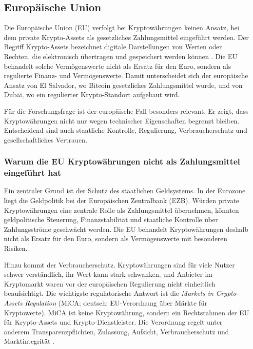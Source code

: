 

\subsection{Europäische Union}

Die Europäische Union (EU) verfolgt bei Kryptowährungen keinen Ansatz, bei dem private Krypto-Assets als gesetzliches Zahlungsmittel eingeführt werden. Der Begriff Krypto-Assets bezeichnet digitale Darstellungen von Werten oder Rechten, die elektronisch übertragen und gespeichert werden können \cite{MiCA2023}. Die EU behandelt solche Vermögenswerte nicht als Ersatz für den Euro, sondern als regulierte Finanz- und Vermögenswerte. Damit unterscheidet sich der europäische Ansatz von El Salvador, wo Bitcoin gesetzliches Zahlungsmittel wurde, und von Dubai, wo ein regulierter Krypto-Standort aufgebaut wird.

Für die Forschungsfrage ist der europäische Fall besonders relevant. Er zeigt, dass Kryptowährungen nicht nur wegen technischer Eigenschaften begrenzt bleiben. Entscheidend sind auch staatliche Kontrolle, Regulierung, Verbraucherschutz und gesellschaftliches Vertrauen.

\subsubsection{Warum die EU Kryptowährungen nicht als Zahlungsmittel eingeführt hat}

Ein zentraler Grund ist der Schutz des staatlichen Geldsystems. In der Eurozone liegt die Geldpolitik bei der Europäischen Zentralbank (EZB). Würden private Kryptowährungen eine zentrale Rolle als Zahlungsmittel übernehmen, könnten geldpolitische Steuerung, Finanzstabilität und staatliche Kontrolle über Zahlungsströme geschwächt werden. Die EU behandelt Kryptowährungen deshalb nicht als Ersatz für den Euro, sondern als Vermögenswerte mit besonderen Risiken.

Hinzu kommt der Verbraucherschutz. Kryptowährungen sind für viele Nutzer schwer verständlich, ihr Wert kann stark schwanken, und Anbieter im Kryptomarkt waren vor der europäischen Regulierung nicht einheitlich beaufsichtigt. Die wichtigste regulatorische Antwort ist die \emph{Markets in Crypto-Assets Regulation} (MiCA; deutsch: EU-Verordnung über Märkte für Kryptowerte). MiCA ist keine Kryptowährung, sondern ein Rechtsrahmen der EU für Krypto-Assets und Krypto-Dienstleister. Die Verordnung regelt unter anderem Transparenzpflichten, Zulassung, Aufsicht, Verbraucherschutz und Marktintegrität \cite{MiCA2023}.

